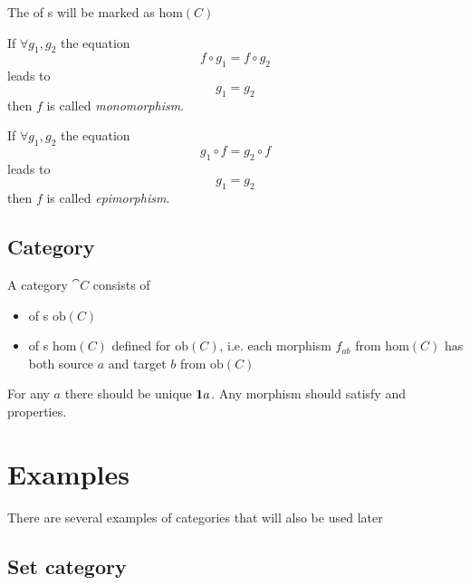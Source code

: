 \begin{remark}
\label{rem:morphclass}
The  of s will be marked as 
$\mathrm{hom}(C)$
\end{remark}

\begin{definition}[Monomorphism]
\label{def:monomorphism}
If $\forall g_1, g_2$ the equation 
\[
f \circ g_1 = f \circ g_2
\]
leads to 
\[
g_1 = g_2
\]
then $f$ is called \textit{monomorphism}.
\end{definition}

\begin{definition}[Epimorphism]
\label{def:epimorphism}
If $\forall g_1, g_2$ the equation 
\[
g_1 \circ f = g_2 \circ f
\]
leads to 
\[
g_1 = g_2
\]
then $f$ is called \textit{epimorphism}.
\end{definition}


\subsection{Category}

\begin{definition}[Category]
\label{def:category}
A category $\cat{C}$ consists of 
\begin{itemize}
\item {} of
s $\mathrm{ob}(C)$
\item {} of s $\mathrm{hom}(C)$
defined for $\mathrm{ob}(C)$, i.e. each morphism $f_{ab}$ from 
$\mathrm{hom}(C)$ has both source
$a$ and target $b$ from $\mathrm{ob}(C)$
\end{itemize}
For any  $a$ there should be unique
 $\idarrow[a]$. Any morphism should satisfy
 and 
properties.  

\end{definition}

\section{Examples}

There are several examples of categories that will also be used later

\subsection{\textbf{Set} category}

